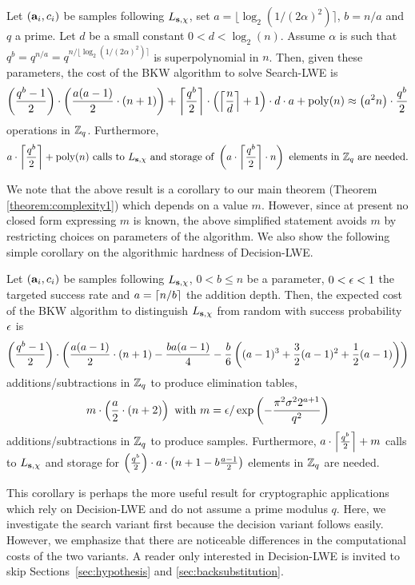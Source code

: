 \def\informaltheorem{Let $(\avec_i,c_i)$ be samples following $\Ldis$, set $a = \lfloor \log_2(1/(2\alpha)^2)\rceil$, $b = n/a$ and $q$ a prime. Let $d$ be a small constant $0 < d < \log_2(n)$. 
Assume $\alpha$ is such that $q^b = q^{n/a} = q^{n/\lfloor\log_2(1/(2\alpha)^2)\rceil }$ is superpolynomial in $n$. Then, given these parameters, the cost of the BKW algorithm to solve \textnormal{Search-LWE} is
\begin{equation*}
\naddssteponeT+ \left\lceil\frac{q^b}{2}\right\rceil \cdot \left(\gnd +1\right) \cdot d \cdot a + \poly \approx \left(a^2n\right) \cdot \frac{q^b}{2}
\end{equation*}
operations in $\Zq$.
Furthermore, 
\begin{equation*}
\ncallsT + \poly \mbox{ calls to $\Ldis$ and storage of }
\left(\ncallsT \cdot n \right) \mbox{ elements in $\Zq$  are needed}.
\end{equation*} 
}
\begin{theorem}
\informaltheorem
\end{theorem}
We note that the above result is a corollary to our main theorem (Theorem \ref{theorem:complexity1}) which depends on a value $m$. However, since at present no closed form expressing $m$ is known, the above simplified statement avoids $m$ by restricting choices on parameters of the algorithm. We also show the following simple corollary on the algorithmic hardness of Decision-LWE.
\begin{corollary}
Let $(\mathbf{a}_i,c_i)$ be samples following $L_{\mathbf{s},\chi}$, $0 < b \leq n$ be a parameter, $0 < \epsilon < 1$ the targeted success rate and $a = \lceil n/b \rceil$ the addition depth. Then, the expected cost of the BKW algorithm to distinguish $L_{\mathbf{s},\chi}$ from random with success probability $\epsilon$ is
$$\left(\frac{q^b-1}{2}\right)\cdot \left( \frac{a(a-1)}{2}\cdot (n+1) - \frac{ba(a-1)}{4}-\frac{b}{6}\left((a-1)^3+\frac{3}{2}(a-1)^2+\frac{1}{2}(a-1)\right) \right)$$
additions/subtractions in $\mathbb{Z}_q$ to produce elimination tables,
$$m\cdot\left(\frac{a}{2}\cdot(n+2)\right) \textnormal{ with } m = \epsilon/\exp\left(-\frac{\pi^{2} \sigma^{2} 2^{{a + 1}}}{q^{2}}\right)$$
additions/subtractions in $\mathbb{Z}_q$ to produce samples. Furthermore,
$a\cdot \left\lceil \frac{q^b}{2}\right\rceil + m$
calls to $L_{\mathbf{s},\chi}$ and storage for
$\left( \frac{q^b}{2} \right) \cdot a\cdot \left(n+1 - b\frac{a-1}{2}\right)$
elements in $\mathbb{Z}_q$ are needed.
\end{corollary}
This corollary is perhaps the more useful result for cryptographic applications which rely on Decision-LWE and do not assume a prime modulus $q$. Here, we investigate the search variant first because the decision variant follows easily. However, we emphasize that there are noticeable differences in the computational costs of the two variants. A reader only interested in Decision-LWE is invited to skip Sections~\ref{sec:hypothesis} and \ref{sec:backsubstitution}.

